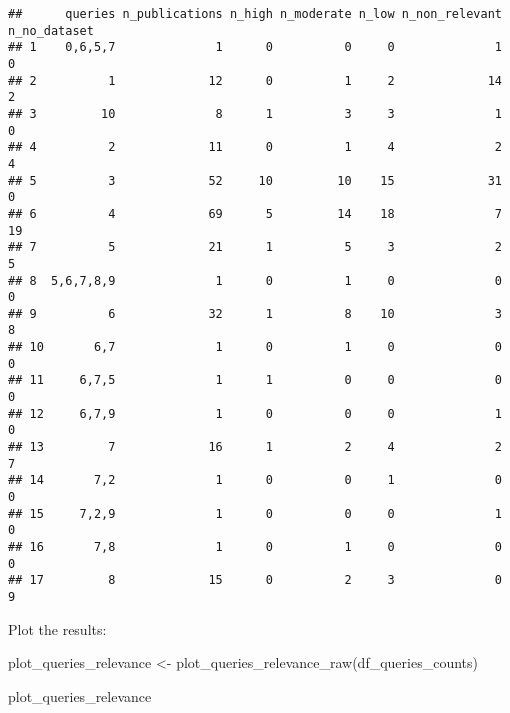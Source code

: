 \documentclass[
]{article}
\newenvironment{Shaded}{\begin{snugshade}}{\end{snugshade}}
\newcommand{\AttributeTok}[1]{\textcolor[rgb]{0.77,0.63,0.00}{#1}}
\newcommand{\FunctionTok}[1]{\textcolor[rgb]{0.00,0.00,0.00}{#1}}
\newcommand{\NormalTok}[1]{#1}
\newcommand{\OtherTok}[1]{\textcolor[rgb]{0.56,0.35,0.01}{#1}}
\newcommand{\SpecialCharTok}[1]{\textcolor[rgb]{0.00,0.00,0.00}{#1}}
\begin{document}
\begin{Shaded}
\end{Shaded}

\begin{verbatim}
##      queries n_publications n_high n_moderate n_low n_non_relevant n_no_dataset
## 1    0,6,5,7              1      0          0     0              1            0
## 2          1             12      0          1     2             14            2
## 3         10              8      1          3     3              1            0
## 4          2             11      0          1     4              2            4
## 5          3             52     10         10    15             31            0
## 6          4             69      5         14    18              7           19
## 7          5             21      1          5     3              2            5
## 8  5,6,7,8,9              1      0          1     0              0            0
## 9          6             32      1          8    10              3            8
## 10       6,7              1      0          1     0              0            0
## 11     6,7,5              1      1          0     0              0            0
## 12     6,7,9              1      0          0     0              1            0
## 13         7             16      1          2     4              2            7
## 14       7,2              1      0          0     1              0            0
## 15     7,2,9              1      0          0     0              1            0
## 16       7,8              1      0          1     0              0            0
## 17         8             15      0          2     3              0            9
\end{verbatim}

Plot the results:

\begin{Shaded}
\begin{Highlighting}[]
\NormalTok{plot\_queries\_relevance }\OtherTok{\textless{}{-}} \FunctionTok{plot\_queries\_relevance\_raw}\NormalTok{(df\_queries\_counts)}

\NormalTok{plot\_queries\_relevance}
\end{Highlighting}
\end{Shaded}
\end{document}
